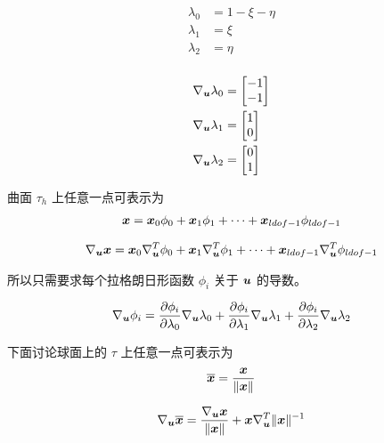 \documentclass{article}
\begin{document}
\begin{align*}
    \lambda_0 &= 1 - \xi - \eta\\
    \lambda_1 &= \xi\\
    \lambda_2 &= \eta\\
\end{align*}

\begin{align*}
    \nabla_{\boldsymbol u} \lambda_0 &= \begin{bmatrix}
        -1 \\ -1
    \end{bmatrix}\\
    \nabla_{\boldsymbol u} \lambda_1 &= \begin{bmatrix}
        1 \\ 0 
    \end{bmatrix}\\
    \nabla_{\boldsymbol u} \lambda_2 &= \begin{bmatrix}
        0 \\ 1
    \end{bmatrix}
\end{align*}

曲面 $\tau_h$ 上任意一点可表示为
\begin{align*}
    {\boldsymbol x} = {\boldsymbol x}_0 \phi_0 + {\boldsymbol x}_1\phi_1 + \cdots + {\boldsymbol x}_{ldof-1}\phi_{ldof-1}
\end{align*}

\begin{align*}
    \nabla_{\boldsymbol u} {\boldsymbol x} = {\boldsymbol x}_0 \nabla_{\boldsymbol u}^T \phi_0 + {\boldsymbol x}_1\nabla_{\boldsymbol u}^T \phi_1
    + \cdots + {\boldsymbol x}_{ldof-1}\nabla_{\boldsymbol u}^T\phi_{ldof-1}
\end{align*}

所以只需要求每个拉格朗日形函数 $\phi_i$ 关于 ${\boldsymbol u}$ 的导数。

\begin{align*}
    \nabla_{\boldsymbol u} \phi_i = 
    \frac{\partial \phi_i}{\partial \lambda_0}\nabla_{\boldsymbol u} \lambda_0 + 
    \frac{\partial \phi_i}{\partial \lambda_1}\nabla_{\boldsymbol u} \lambda_1 + 
    \frac{\partial \phi_i}{\partial \lambda_2}\nabla_{\boldsymbol u} \lambda_2 
\end{align*}



下面讨论球面上的 $\tau$ 上任意一点可表示为
\begin{align*}
    \overline{{\boldsymbol x}} = \frac{{\boldsymbol x}}{\|{\boldsymbol x}\|}
\end{align*}

\begin{align*}
    \nabla_{\boldsymbol u} \overline{{\boldsymbol x}} = \frac{\nabla_{\boldsymbol u}{\boldsymbol x}}{\|{\boldsymbol x}\|} +
    {\boldsymbol x}\nabla_{\boldsymbol u}^T \|{\boldsymbol x}\|^{-1}
\end{align*}
\end{document}
